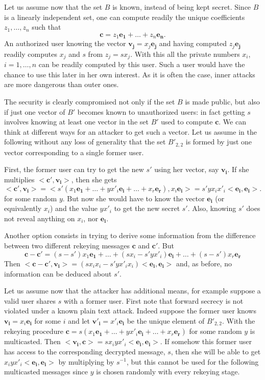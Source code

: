 \documentclass[a4paper,11pt]{amsart}
\theoremstyle{definition}
\begin{document}
Let us assume now that the set $B$ is known, instead of being kept secret. Since $B$
is a linearly independent set, one can compute readily the unique
coefficients $z_1,\ldots,z_n$ such that
$$
\mathbf{c} =z_1 \mathbf{e_1} + \dots +z_n \mathbf{e_n} .
$$
An authorized user knowing the vector $\mathbf{v_j} =x_j\mathbf{e_j} $
and having computed $z_j\mathbf{e_j} $ readily computes $x_j$ and $s$
from $z_j=sx_j$. With this all the private numbers $x_i$,
$i=1,\ldots,n$ can be readily computed by this user. Such a user would
have the chance to use this later in her own interest. As it is often
the case, inner attacks are more dangerous than outer ones.

The security is clearly compromised not only if the set $B$ is made
public, but also if just one vector of $B'$ becomes known to
unauthorized users: in fact getting $s$ involves knowing at least one
vector in the set $B'$ used to compute $\mathbf{c} $. We can think at
different ways for an attacker to get such a vector. Let us assume in
the following without any loss of generality that the set $B'_{2,2}$
is formed by just one vector corresponding to a single former user.




First, the former user can try to get the new $s'$ using her vector,
say $\mathbf{v_i} $. If she multiplies $<\mathbf{c'} ,\mathbf{v_i} >$,
then she gets
$$
<\mathbf{c'} ,\mathbf{v_i} >=<s'(x_1\mathbf{e_1} +\dots
+yx'_i\mathbf{e_i} +\dots +x_r\mathbf{e_r} ),x_i\mathbf{ e_i}>
=s'yx_ix'_i<\mathbf{e_i} ,\mathbf{e_i} >.
$$
\noindent for some random $y$. But now she would have to know the
vector $\mathbf{e_i} $ (or equivalently $x_i$) and the value $yx'_i$
to get the new secret
$s'$. Also, knowing $s'$ does not reveal anything on $x_i$, nor
$\mathbf{e_i}$.


Another option consists in trying to derive some information from the
difference between two different rekeying messages $\mathbf{c} $ and
$\mathbf{c'} $. But
$$\mathbf{c} -\mathbf{c'} =(s-s')x_1\mathbf{e_1} +\dots +(sx_i-s'yx'_i)
\mathbf{e_i} +\dots +(s-s')x_r\mathbf{e_r} $$ Then $<\mathbf{c}
-\mathbf{c'} ,\mathbf{v_i} >=(sx_ix_i-s'yx'_ix_i)<\mathbf{e_i}
,\mathbf{e_i} >$ and, as before, no information can be deduced about
$s'$.



Let us assume now that the attacker has additional means, for example
suppose a valid user shares $s$ with a former user. 
First note that 
forward secrecy is not violated under a known plain text attack.
Indeed
suppose the former user knows $\mathbf{v_i} =
x_i\mathbf{e_i}$ for some $i$ and let $\mathbf{v'_i}=x'_i\mathbf{e_i}$
be the unique element of $B'_{2,2}$. With the rekeying procedure
$\mathbf{c} = s(x_1\mathbf{e_1}+ \dots + yx'_i\mathbf{e_i} + \dots +
x_r\mathbf{e_r})$ for some random $y$ is multicasted. Then
$<\mathbf{v_i},\mathbf{c}>=sx_iyx'_i<\mathbf{e_i}, \mathbf{e_i}>$.  If
somehow this former user has access to the corresponding decrypted
message, $s$, then she will be able to get $x_iyx'_i<\mathbf{e_i},
\mathbf{e_i}>$ by multiplying by $s^{-1}$, but this cannot be used for
the following multicasted messages since $y$ is chosen randomly with
every rekeying stage. 
\end{document}
